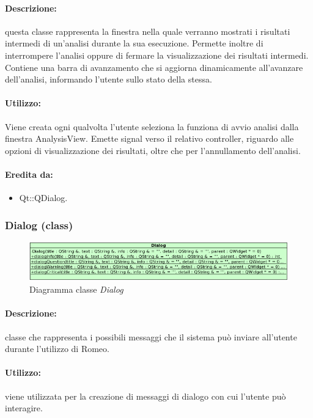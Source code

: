 	\paragraph{Descrizione:} questa classe rappresenta la finestra nella quale verranno mostrati i risultati intermedi di un’analisi durante la sua esecuzione. Permette inoltre di interrompere l’analisi oppure di fermare la visualizzazione dei risultati intermedi. Contiene una barra di avanzamento che si aggiorna dinamicamente all’avanzare dell’analisi, informando l’utente sullo stato della stessa.
	\paragraph{Utilizzo:} Viene creata ogni qualvolta l’utente seleziona la funziona di avvio analisi dalla finestra AnalysisView. Emette signal\g{} verso il relativo controller, riguardo alle opzioni di visualizzazione dei risultati, oltre che per l’annullamento dell’analisi.
	\paragraph{Eredita da:}
		\begin{itemize}
			\item Qt::QDialog.
		\end{itemize}
	\subsubsection{Dialog (class)}
	\begin{figure}[!h]
		\centering
		\includegraphics[scale=2.75]{./Content/Immagini/view/Dialog}
		\caption{Diagramma classe \textsl{Dialog}}
	\end{figure}
	\paragraph{Descrizione:} classe che rappresenta i possibili messaggi che il sistema può inviare all’utente durante l’utilizzo di Romeo.
	\paragraph{Utilizzo:} viene utilizzata per la creazione di messaggi di dialogo con cui l'utente può interagire.
